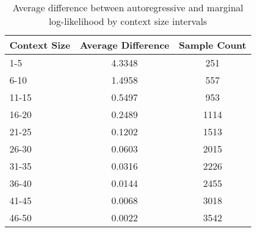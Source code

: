 \begin{table}[htbp]
\centering
\begin{tabular}{lcc}
\toprule
Context Size & Average Difference & Sample Count \\
\midrule
1-5 & 4.3348 & 251 \\
6-10 & 1.4958 & 557 \\
11-15 & 0.5497 & 953 \\
16-20 & 0.2489 & 1114 \\
21-25 & 0.1202 & 1513 \\
26-30 & 0.0603 & 2015 \\
31-35 & 0.0316 & 2226 \\
36-40 & 0.0144 & 2455 \\
41-45 & 0.0068 & 3018 \\
46-50 & 0.0022 & 3542 \\
\bottomrule
\end{tabular}
\caption{Average difference between autoregressive and marginal log-likelihood by context size intervals}
\label{tab:context_size_diff}
\end{table}